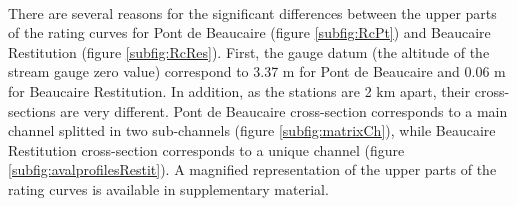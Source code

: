 \documentclass[11pt]{article}
\begin{document}
    \paragraph{}
There are several reasons for the significant differences between the upper parts of the rating curves for Pont de Beaucaire (figure \ref{subfig:RcPt}) and Beaucaire Restitution (figure \ref{subfig:RcRes}). First, the gauge datum (the altitude of the stream gauge zero value) correspond to 3.37 m for Pont de Beaucaire and 0.06 m for Beaucaire Restitution. In addition, as the stations are 2 km apart, their cross-sections are very different. Pont de Beaucaire cross-section corresponds to a main channel splitted in two sub-channels (figure \ref{subfig:matrixCh}), while Beaucaire Restitution cross-section corresponds to a unique channel (figure \ref{subfig:avalprofilesRestit}). A magnified representation of the upper parts of the rating curves is available in supplementary material.
	
\end{document}
